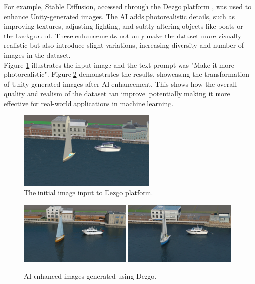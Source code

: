 \noindent For example, Stable Diffusion, accessed through the Dezgo platform \cite{Dezgo2024}, was used to enhance Unity-generated images. The AI adds photorealistic details, such as improving textures, adjusting lighting, and subtly altering objects like boats or the background. These enhancements not only make the dataset more visually realistic but also introduce slight variations, increasing diversity and number of images in the dataset.\\

\noindent Figure \ref{fig:ai_promt} illustrates the input image and the text prompt was "Make it more photorealistic". Figure \ref{fig:ai_enhanced} demonstrates the results, showcasing the transformation of Unity-generated images after AI enhancement. This shows how the overall quality and realism of the dataset can improve, potentially making it more effective for real-world applications in machine learning.

\begin{figure}[H]
\centering
\includegraphics[width=0.6\textwidth]{Figures/rgb_2.png}
\caption{The initial image input to Dezgo platform.}
\label{fig:ai_promt}
\end{figure}

\begin{figure}[H]
\centering
\includegraphics[width=0.49\textwidth]{Figures/results/photorealistic_3613113118.png}
\includegraphics[width=0.49\textwidth]{Figures/results/photorealistic_2942539231.png}
\caption{AI-enhanced images generated using Dezgo.}
\label{fig:ai_enhanced}
\end{figure}

